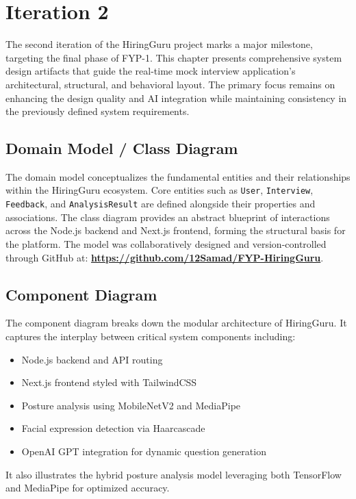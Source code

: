 \chapter{Iteration 2}
\label{ch:iter2}

The second iteration of the HiringGuru project marks a major milestone, targeting the final phase of FYP-1. This chapter presents comprehensive system design artifacts that guide the real-time mock interview application’s architectural, structural, and behavioral layout. The primary focus remains on enhancing the design quality and AI integration while maintaining consistency in the previously defined system requirements.

\section{Domain Model / Class Diagram}
The domain model conceptualizes the fundamental entities and their relationships within the HiringGuru ecosystem. Core entities such as \texttt{User}, \texttt{Interview}, \texttt{Feedback}, and \texttt{AnalysisResult} are defined alongside their properties and associations. The class diagram provides an abstract blueprint of interactions across the Node.js backend and Next.js frontend, forming the structural basis for the platform. The model was collaboratively designed and version-controlled through GitHub at: \textbf{\url{https://github.com/12Samad/FYP-HiringGuru}}.

\section{Component Diagram}
The component diagram breaks down the modular architecture of HiringGuru. It captures the interplay between critical system components including:
\begin{itemize}
    \item Node.js backend and API routing
    \item Next.js frontend styled with TailwindCSS
    \item Posture analysis using MobileNetV2 and MediaPipe
    \item Facial expression detection via Haarcascade
    \item OpenAI GPT integration for dynamic question generation
\end{itemize}
It also illustrates the hybrid posture analysis model leveraging both TensorFlow and MediaPipe for optimized accuracy.

